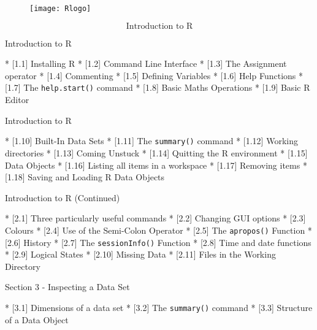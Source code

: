 \documentclass{beamer}
\begin{document}
 
 \begin{figure}
 \centering
 \texttt{[image: Rlogo]}
 \end{figure}
 \[ \mbox{Introduction to R} \]
 
 

 
 
{Introduction to R}
 
 * [1.1] Installing R      
 * [1.2] Command Line Interface     
 * [1.3] The Assignment operator     
 * [1.4] Commenting      
 * [1.5] Defining Variables     
 * [1.6] Help Functions      
 * [1.7] The \texttt{help.start()} command     
 * [1.8] Basic Maths Operations     
 * [1.9] Basic R Editor      

 
 
 
{Introduction to R}
 
 * [1.10] Built-In Data Sets      
 * [1.11] The \texttt{summary()} command     
 * [1.12] Working directories      
 * [1.13] Coming Unstuck    
 * [1.14] Quitting the R environment   
 * [1.15] Data Objects  
 * [1.16] Listing all items in a workspace     
 * [1.17] Removing items   
 * [1.18] Saving and Loading R Data Objects    

 
 
 
{Introduction to R (Continued) }
 
 * [2.1] Three particularly useful commands    
 * [2.2] Changing GUI options     
 * [2.3] Colours      
 * [2.4] Use of the Semi-Colon Operator     
 * [2.5] The \texttt{apropos()} Function     
 * [2.6] History       
 * [2.7] The \texttt{sessionInfo()} Function     
 * [2.8] Time and date functions     
 * [2.9] Logical States      
 * [2.10] Missing Data      
 * [2.11] Files in the Working Directory     

 
 
{Section 3 - Inspecting a Data Set }
 
 * [3.1] Dimensions of a data set 
 * [3.2] The \texttt{summary()} command 
 * [3.3] Structure of a Data Object 
\end{document}
